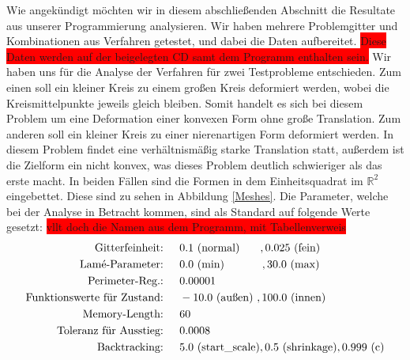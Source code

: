 Wie angekündigt möchten wir in diesem abschließenden Abschnitt die Resultate aus unserer Programmierung analysieren. Wir haben mehrere Problemgitter und Kombinationen aus Verfahren getestet, und dabei die Daten aufbereitet. \colorbox{red}{Diese Daten werden auf der beigelegten CD samt dem Programm enthalten sein.}
Wir haben uns für die Analyse der Verfahren für zwei Testprobleme entschieden. Zum einen soll ein kleiner Kreis zu einem großen Kreis deformiert werden, wobei die Kreismittelpunkte jeweils gleich bleiben. Somit handelt es sich bei diesem Problem um eine Deformation einer konvexen Form ohne große Translation. Zum anderen soll ein kleiner Kreis zu einer nierenartigen Form deformiert werden. In diesem Problem findet eine verhältnismäßig starke Translation statt, außerdem ist die Zielform ein nicht konvex, was dieses Problem deutlich schwieriger als das erste macht. In beiden Fällen sind die Formen in dem Einheitsquadrat im $\mathbb{R}^2$ eingebettet. Diese sind zu sehen in Abbildung \ref{Meshes}. 
Die Parameter, welche bei der Analyse in Betracht kommen, sind als Standard auf folgende Werte gesetzt:
\colorbox{red}{vllt doch die Namen aus dem Programm, mit Tabellenverweis}
\begin{align*}
\text{Gitterfeinheit: \hspace{0.2cm} }& 0.1 \text{ (normal)} \hspace{0.65cm} ,0.025 \text{ (fein)} \\
\text{Lamé-Parameter: \hspace{0.2cm} }& 0.0 \text{ (min)} \hspace{1.2cm}  ,30.0 \text{ (max)} \\
\text{Perimeter-Reg.: \hspace{0.2cm} }& 0.00001 \\
\text{Funktionswerte für Zustand: \hspace{0.2cm} }& -10.0 \text{ (außen) },  100.0 \text{ (innen)} \\
\text{Memory-Length: \hspace{0.2cm} }& 60 \\
\text{Toleranz für Ausstieg: \hspace{0.2cm} }& 0.0008 \\
\text{Backtracking: \hspace{0.2cm} }& 5.0 \text{ (start\_scale)}, 0.5 \text{ (shrinkage)}, 0.999 \text{ (c)}
\end{align*}


